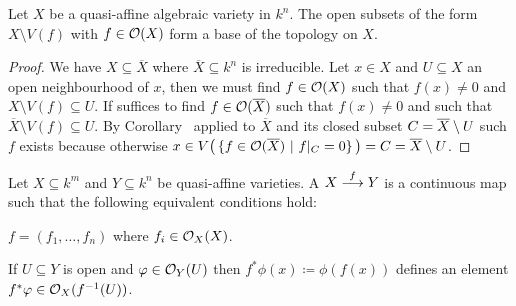 \documentclass[a4paper,parskip=half,numbers=enddot, DIV=12]{scrreprt}
\begin{document}
	\begin{fact}
	 Let $X$ be a quasi-affine algebraic variety in $k^n$. The open subsets of the form $X\setminus V(f)$ with $f\in\mathcal{O}(X)$ form a base of the topology on $X$.
	\end{fact}
	\begin{proof}
	 We have $X\subseteq \overline{X}$ where $\overline{X}\subseteq k^n$ is irreducible. Let $x\in X$ and $U\subseteq X$ an open neighbourhood of $x$, then we must find $f\in \mathcal{O}(X)$ such that $f(x)\neq 0$ and $X\setminus V(f)\subseteq U$. If suffices to find $f\in \mathcal{O}(\overline{X})$ such that $f(x)\neq 0$ and such that $\overline{X}\setminus V(f)\subseteq U$. By Corollary~ applied to $\overline{X}$ and its closed subset $C=\overline{X}\setminus U$ such $f$ exists because otherwise $x\in V\big(\left\{f\in \mathcal{O}(\smash{\overline{X}})\ \middle|\  f|_C=0\right\}\big) =C=\overline{X}\setminus U$.
	\end{proof}
	\begin{defi}
	 Let $X\subseteq k^m$ and $Y\subseteq k^n$ be quasi-affine varieties. A  $X\morphism[f] Y$ is a continuous map such that the following equivalent conditions hold:
	 \begin{alphanumerate}
	  \item $f= (f_1,\ldots,f_n)$ where $f_i\in\mathcal{O}_X(X)$.
	  \item If $U\subseteq Y$ is open and $\varphi\in \mathcal{O}_Y(U)$ then $f^*\phi(x)\coloneqq \phi(f(x))$ defines an element $f^*\varphi\in\mathcal{O}_X(f^{-1}(U))$.
	 \end{alphanumerate}

	\end{defi}
\end{document}
